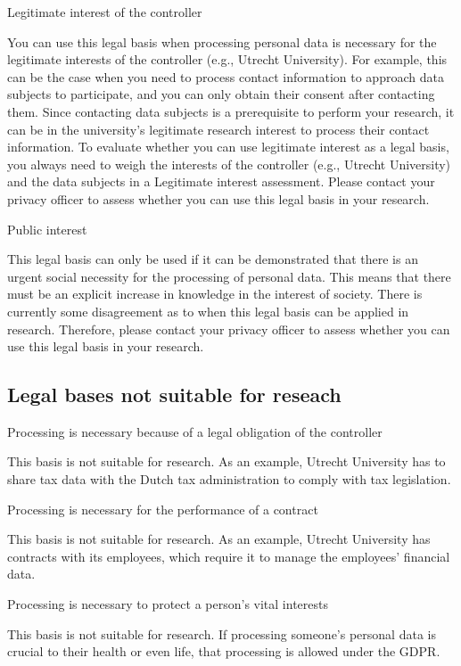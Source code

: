 \documentclass[
]{book}
\begin{document}
Legitimate interest of the controller

You can
use this legal basis when processing personal data is necessary for the legitimate interests of the controller (e.g., Utrecht University).
For example, this can be the case when you need to process contact information to approach data subjects to participate, and you can only obtain their
consent after contacting them. Since contacting data subjects is a prerequisite to perform your research, it can be in the university's legitimate research
interest to process their contact information. To evaluate whether you can use legitimate interest as a legal basis, you always need to weigh the interests
of the controller (e.g., Utrecht University) and the data subjects in a Legitimate interest assessment. Please
contact your privacy officer to assess whether you can use this legal basis in your research.

Public interest

This legal basis
can only be used if it can be demonstrated that there is an urgent social necessity for the processing of personal data.
This means that there must be an explicit increase in knowledge in the interest of society. There is currently some disagreement as to when this legal basis
can be applied in research. Therefore, please contact your
privacy officer to assess whether you
can use this legal basis in your research.

\hypertarget{legal-bases-not-suitable-for-reseach}{%
\subsection{Legal bases not suitable for reseach}\label{legal-bases-not-suitable-for-reseach}}

Processing is necessary because of a legal obligation of the controller

This basis
is not suitable for research. As an example, Utrecht University has to share tax data with the Dutch tax administration
to comply with tax legislation.

Processing is necessary for the performance of a contract

This basis
is not suitable for research. As an example, Utrecht University has contracts with its employees, which require
it to manage the employees' financial data.

Processing is necessary to protect a person's vital interests

This basis
is not suitable for research. If processing someone's personal data is crucial to their health or even life,
that processing is allowed under the GDPR.
\end{document}
